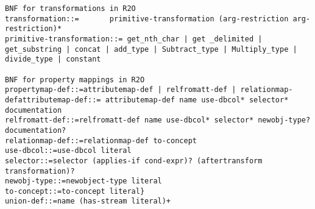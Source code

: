 \begin{lstlisting}[style=BNFStyle,language=BNF,label=list:schema,caption=Grammar of the \stwoo mapping language.]
BNF for transformations in R2O
transformation::= 		primitive-transformation (arg-restriction arg-restriction)*
primitive-transformation::= get_nth_char | get _delimited | get_substring | concat | add_type | Subtract_type | Multiply_type | divide_type | constant

BNF for property mappings in R2O
propertymap-def::=attributemap-def | relfromatt-def | relationmap-defattributemap-def::= attributemap-def name use-dbcol* selector* documentation
relfromatt-def::=relfromatt-def name use-dbcol* selector* newobj-type? documentation?
relationmap-def::=relationmap-def to-concept
use-dbcol::=use-dbcol literal
selector::=selector (applies-if cond-expr)? (aftertransform transformation)?
newobj-type::=newobject-type literal
to-concept::=to-concept literal}
union-def::=name (has-stream literal)+
\end{lstlisting}
